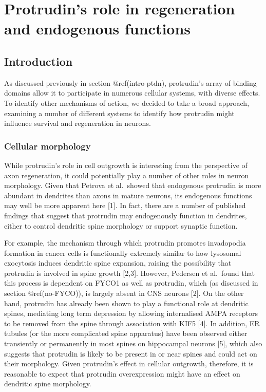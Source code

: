 \documentclass[
  12pt,
  a4paper,
]{article}
\author{}
\date{\vspace{-2.5em}}
\begin{document}
\hypertarget{protrudins-role-in-regeneration-and-endogenous-functions}{%
\section{Protrudin's role in regeneration and endogenous
functions}\label{protrudins-role-in-regeneration-and-endogenous-functions}}

\hypertarget{introduction}{%
\subsection{Introduction}\label{introduction}}

As discussed previously in section @ref(intro-ptdn), protrudin's array
of binding domains allow it to participate in numerous cellular systems,
with diverse effects. To identify other mechanisms of action, we decided
to take a broad approach, examining a number of different systems to
identify how protrudin might influence survival and regeneration in
neurons.

\hypertarget{cellular-morphology}{%
\subsubsection{Cellular morphology}\label{cellular-morphology}}

While protrudin's role in cell outgrowth is interesting from the
perspective of axon regeneration, it could potentially play a number of
other roles in neuron morphology. Given that Petrova et al.~showed that
endogenous protrudin is more abundant in dendrites than axons in mature
neurons, its endogenous functions may well be more apparent here
{[}1{]}. In fact, there are a number of published findings that suggest
that protrudin may endogenously function in dendrites, either to control
dendritic spine morphology or support synaptic function.

For example, the mechanism through which protrudin promotes invadopodia
formation in cancer cells is functionally extremely similar to how
lysosomal exocytosis induces dendritic spine expansion, raising the
possibility that protrudin is involved in spine growth {[}2,3{]}.
However, Pedersen et al.~found that this process is dependent on FYCO1
as well as protrudin, which (as discussed in section @ref(no-FYCO)), is
largely absent in CNS neurons {[}2{]}. On the other hand, protrudin has
already been shown to play a functional role at dendritic spines,
mediating long term depression by allowing internalised AMPA receptors
to be removed from the spine through association with KIF5 {[}4{]}. In
addition, ER tubules (or the more complicated spine apparatus) have been
observed either transiently or permanently in most spines on hippocampal
neurons {[}5{]}, which also suggests that protrudin is likely to be
present in or near spines and could act on their morphology. Given
protrudin's effect in cellular outgrowth, therefore, it is reasonable to
expect that protrudin overexpression might have an effect on dendritic
spine morphology.
\end{document}
